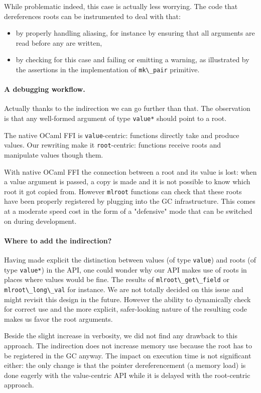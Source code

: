 \documentclass[a4paper]{easychair}
\newcommand{\cpp}[1]{\lstinline[style=C++]{#1}}
\begin{document}
While problematic indeed, this case is actually less worrying. The code
that dereferences roots can be instrumented to deal with that:
%
\begin{itemize}
\item by properly handling aliasing, for instance by ensuring that all
      arguments are read before any are written,
\item by checking for this case and failing or emitting a warning, as
      illustrated by the assertions in the implementation of
      \cpp{mk\_pair} primitive. 
\end{itemize}

\paragraph{A debugging workflow.} Actually thanks to the indirection we can go
further than that. The observation is that any well-formed argument of type
\cpp{value*} should point to a root. 

The native OCaml FFI is \texttt{value}-centric: functions directly take and produce
values. Our rewriting make it \texttt{root}-centric: functions receive roots
and manipulate values though them.

With native OCaml FFI the connection between a root and its value is lost: when
a value argument is passed, a copy is made and it is not possible to know which
root it got copied from.  However \cpp{mlroot} functions can check that these
roots have been properly registered by plugging into the GC infrastructure.
This comes at a moderate speed cost in the form of a "defensive" mode that can
be switched on during development.

\paragraph{Where to add the indirection?}

Having made explicit the distinction between values (of type
\cpp{value}) and roots (of type \cpp{value*}) in the API, one
could wonder why our API makes use of roots in places where values would be
fine. The results of \cpp{mlroot\_get\_field} or \cpp{mlroot\_long\_val} for
instance.  We are not totally decided on this issue and might revisit this
design in the future. However the ability to dynamically check for correct use
and the more explicit, safer-looking nature of the resulting code makes us
favor the root arguments.

Beside the slight increase in verbosity, we did not find any drawback to
this approach.  The indirection does not increase memory use because the root
has to be registered in the GC anyway. The impact on execution time is not significant either: the only change is that the pointer dereferencement (a memory load) is done eagerly with the value-centric API while it is delayed with the root-centric approach.
\end{document}
